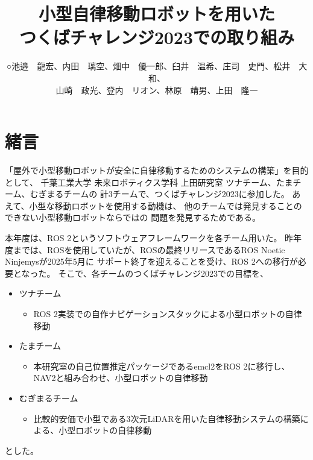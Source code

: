 \documentclass[twocolumn,9pt]{jsproceedings}
\title{小型自律移動ロボットを用いた\\つくばチャレンジ2023での取り組み}
\author{○池邉　龍宏\authorrefmark{2}、内田　璃空\authorrefmark{2}、畑中　優一郎\authorrefmark{1}、臼井　温希\authorrefmark{1}、庄司　史門\authorrefmark{1}、松井　大和\authorrefmark{1}、\\
山崎　政光\authorrefmark{1}、登内　リオン\authorrefmark{1}、林原　靖男\authorrefmark{1}、上田　隆一\authorrefmark{1}}
\affiliation{千葉工業大学 未来ロボティクス学科 Cat Aチーム/Bチーム}
\begin{document}
\maketitle


\section{緒言}

「屋外で小型移動ロボットが安全に自律移動するためのシステムの構築」を目的として、
千葉工業大学 未来ロボティクス学科 上田研究室 ツナチーム、たまチーム、むぎまるチームの
計3チームで、つくばチャレンジ2023に参加した。
あえて、小型な移動ロボットを使用する動機は、
他のチームでは発見することのできない小型移動ロボットならではの
問題を発見するためである。

本年度は、ROS 2というソフトウェアフレームワークを各チーム用いた。
昨年度までは、ROSを使用していたが、ROSの最終リリースであるROS Noetic Ninjemysが2025年5月に
サポート終了を迎えることを受け、ROS 2への移行が必要となった。
そこで、各チームのつくばチャレンジ2023での目標を、

\begin{itemize}
  \item ツナチーム
  \begin{itemize}
    \item ROS 2実装での自作ナビゲーションスタックによる小型ロボットの自律移動
  \end{itemize}
  \item たまチーム
  \begin{itemize}
    \item 本研究室の自己位置推定パッケージであるemcl2をROS 2に移行し、NAV2と組み合わせ、小型ロボットの自律移動
  \end{itemize}
  \item むぎまるチーム
  \begin{itemize}
    \item 比較的安価で小型である3次元LiDARを用いた自律移動システムの構築による、小型ロボットの自律移動
  \end{itemize}
\end{itemize}
とした。
\end{document}
